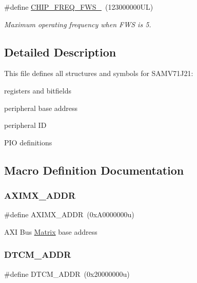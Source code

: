 \begin{DoxyCompactItemize}
\mbox{\label{group__SAMV71J21__definitions_ga3b66824f858591135877b369f98d48a5}} 
\#define \mbox{\hyperlink{group__SAMV71J21__definitions_ga3b66824f858591135877b369f98d48a5}{C\+H\+I\+P\+\_\+\+F\+R\+E\+Q\+\_\+\+F\+W\+S\+\_}}~(123000000\+U\+L)
\begin{DoxyCompactList}\small\item\em Maximum operating frequency when F\+WS is 5. \end{DoxyCompactList}\end{DoxyCompactItemize}


\subsection{Detailed Description}
This file defines all structures and symbols for S\+A\+M\+V71\+J21\+:
\begin{DoxyItemize}
\item registers and bitfields
\item peripheral base address
\item peripheral ID
\item P\+IO definitions 
\end{DoxyItemize}

\subsection{Macro Definition Documentation}
\mbox{\label{group__SAMV71J21__definitions_ga2fb7cc681bf5e7fbce5e3635b72a330a}} 
\subsubsection{\texorpdfstring{AXIMX\_ADDR}{AXIMX\_ADDR}}
{\footnotesize\ttfamily \#define A\+X\+I\+M\+X\+\_\+\+A\+D\+DR~(0x\+A0000000u)}

A\+XI Bus \mbox{\hyperlink{structMatrix}{Matrix}} base address \mbox{\label{group__SAMV71J21__definitions_ga26626a425f7ebb3a0c2dbc276f0d9f78}} 
\subsubsection{\texorpdfstring{DTCM\_ADDR}{DTCM\_ADDR}}
{\footnotesize\ttfamily \#define D\+T\+C\+M\+\_\+\+A\+D\+DR~(0x20000000u)}

